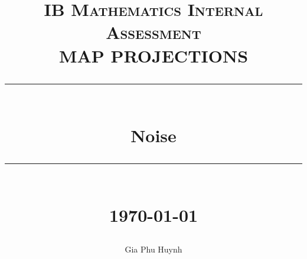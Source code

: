 \documentclass[10pt]{article}
\title{ 
    \normalsize \textsc{IB Mathematics Internal Assessment} \\ [2.5cm]

	\LARGE MAP PROJECTIONS
	\rule{\linewidth}{0.5pt} \\
	\Large \textbf{Noise}
	\rule{\linewidth}{1pt} \\ [1cm]
	\normalsize \today \vspace*{5\baselineskip}
}
\date{}
\author{Gia Phu Huynh}
\begin{document}
\maketitle

\pagebreak
\raggedright


\pagebreak
\raggedright


\pagebreak
\raggedright


\pagebreak
\raggedright


\pagebreak
\raggedright

\end{document}
